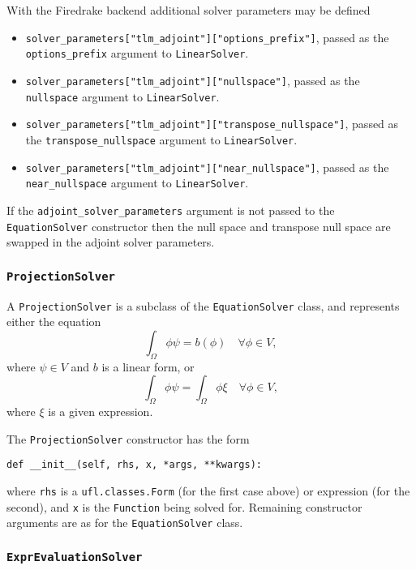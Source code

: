 \documentclass[11pt]{article}
\begin{document}
With the Firedrake backend additional solver parameters may be defined
\begin{itemize}
  \item \texttt{solver\_parameters["tlm\_adjoint"]["options\_prefix"]}, passed
    as the \texttt{options\_prefix} argument to \texttt{LinearSolver}.
  \item \texttt{solver\_parameters["tlm\_adjoint"]["nullspace"]},
    passed as the \texttt{nullspace} argument to \texttt{LinearSolver}. 
  \item \texttt{solver\_parameters["tlm\_adjoint"]["transpose\_nullspace"]},
    passed as the \texttt{transpose\_nullspace} argument to
    \texttt{LinearSolver}. 
  \item \texttt{solver\_parameters["tlm\_adjoint"]["near\_nullspace"]}, passed
    as the \texttt{near\_nullspace} argument to \texttt{LinearSolver}. 
\end{itemize}
If the \texttt{adjoint\_solver\_parameters} argument is not passed to the
\texttt{EquationSolver} constructor then the null space and transpose null
space are swapped in the adjoint solver parameters.

\subsubsection{\texttt{ProjectionSolver}}

A \texttt{ProjectionSolver} is a subclass of the \texttt{EquationSolver} class,
and represents either the equation
\begin{equation*}
  \int_\Omega \phi \psi = b \left( \phi \right) \quad \forall \phi \in V,
\end{equation*}
where $\psi \in V$ and $b$ is a linear form, or
\begin{equation*}
  \int_\Omega \phi \psi = \int_\Omega \phi \xi \quad \forall \phi \in V,
\end{equation*}
where $\xi$ is a given expression.

The \texttt{ProjectionSolver} constructor has the form
\begin{lstlisting}
def __init__(self, rhs, x, *args, **kwargs):
\end{lstlisting}
where \texttt{rhs} is a \texttt{ufl.classes.Form} (for the first case above) or
expression (for the second), and \texttt{x} is the \texttt{Function} being
solved for. Remaining constructor arguments are as for the
\texttt{EquationSolver} class.

\subsubsection{\texttt{ExprEvaluationSolver}}
\end{document}
